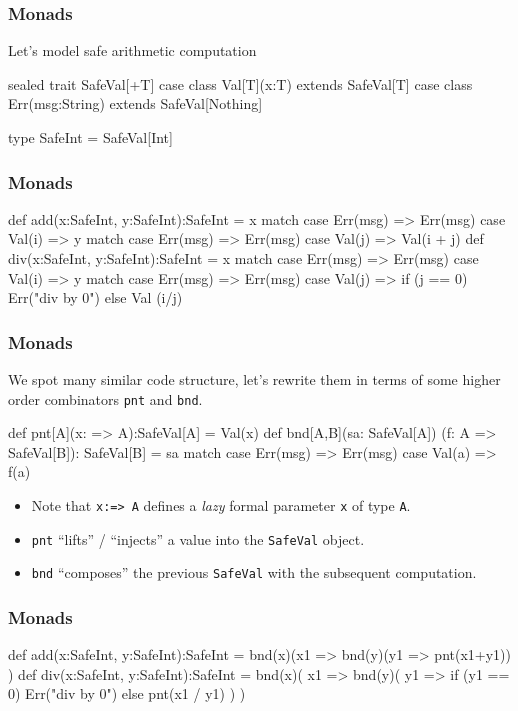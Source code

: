 \documentclass{beamer}
\newcommand{\beb}{\begin{exampleblock}}
\newcommand{\eeb}{\end{exampleblock}}
\begin{document}
\begin{frame}[fragile]
\frametitle{Monads}
Let's model safe arithmetic computation
\beb{}
\begin{code}
sealed trait SafeVal[+T] 
case class Val[T](x:T) extends SafeVal[T]
case class Err(msg:String) extends SafeVal[Nothing]

type SafeInt = SafeVal[Int]
\end{code}
\eeb{}
\end{frame}

\begin{frame}[fragile]
\frametitle{Monads}
\beb{}
\begin{code}
def add(x:SafeInt, y:SafeInt):SafeInt = x match {
  case Err(msg) => Err(msg)
  case Val(i) => y match {
    case Err(msg) => Err(msg)
    case Val(j) => Val(i + j)
  }
}
def div(x:SafeInt, y:SafeInt):SafeInt = x match  {
  case Err(msg) => Err(msg)
  case Val(i) => y match {
    case Err(msg) => Err(msg)
    case Val(j) => { 
        if (j == 0) {Err("div by 0")} else {Val (i/j)}
    }
  }
}
\end{code}
\eeb{}
\end{frame}

\begin{frame}[fragile]
\frametitle{Monads}
We spot many similar code structure, let's rewrite them in terms of
some higher order combinators {\tt pnt} and {\tt bnd}.
\beb{}
\begin{code}
def pnt[A](x: => A):SafeVal[A] = Val(x)
def bnd[A,B](sa: SafeVal[A])
  (f: A => SafeVal[B]): SafeVal[B] = sa match {
  case Err(msg) => Err(msg)
  case Val(a)   => f(a)
}
\end{code}
\eeb{}
\begin{itemize}
\item Note that {\tt x:=> A} defines a {\em lazy} formal parameter {\tt x}
of type {\tt A}.
\item {\tt pnt} ``lifts'' / ``injects'' a value into the {\tt SafeVal}
  object.
\item {\tt bnd} ``composes'' the previous {\tt SafeVal} with the
  subsequent computation.
\end{itemize}
\end{frame}
\begin{frame}[fragile]
\frametitle{Monads}
\beb{}
\begin{code}
def add(x:SafeInt, y:SafeInt):SafeInt = {
  bnd(x)(x1 => { 
    bnd(y)(y1 => pnt(x1+y1))
  })
}
def div(x:SafeInt, y:SafeInt):SafeInt = {
  bnd(x)( x1 => {
    bnd(y)( y1 => {
      if (y1 == 0) { Err("div by 0") }
      else { pnt(x1 / y1) }
    })
  })
}
\end{code}
\eeb{}
\end{frame}
\end{document}
